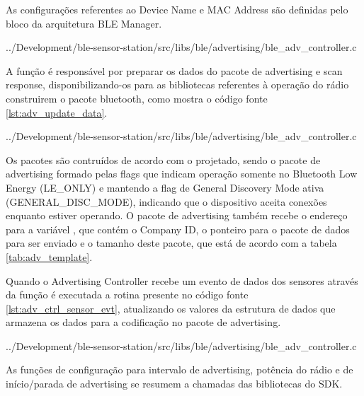 As configurações referentes ao Device Name e MAC Address são definidas pelo
bloco da arquitetura BLE Manager.

\begin{minipage}{0.95\linewidth} 

{../Development/ble-sensor-station/src/libs/ble/advertising/ble_adv_controller.c}
\end{minipage}

A função  é responsável por preparar os dados do
pacote de advertising e scan response, disponibilizando-os para as bibliotecas
referentes à operação do rádio construirem o pacote bluetooth, como mostra o código fonte
\ref{lst:adv_update_data}.

\begin{minipage}{0.95\linewidth} 
 
{../Development/ble-sensor-station/src/libs/ble/advertising/ble_adv_controller.c}
\end{minipage}

Os pacotes são contruídos de acordo com o projetado, sendo o pacote de
advertising formado pelas flags que indicam operação somente no Bluetooth Low
Energy (LE\_ONLY) e mantendo a flag de General Discovery Mode ativa
(GENERAL\_DISC\_MODE), indicando que o dispositivo aceita conexões enquanto
estiver operando. O pacote de advertising também recebe o endereço para a
variável , que contém o Company ID, o ponteiro para o
pacote de dados para ser enviado e o tamanho deste pacote, que está de acordo
com a tabela \ref{tab:adv_template}.

Quando o Advertising Controller recebe um evento de dados dos sensores através
da função  é executada a rotina presente no
código fonte \ref{lst:adv_ctrl_sensor_evt}, atualizando os valores da estrutura
de dados que armazena os dados para a codificação no pacote de advertising.

\begin{minipage}{0.95\linewidth} 

{../Development/ble-sensor-station/src/libs/ble/advertising/ble_adv_controller.c}
\end{minipage}

As funções de configuração para intervalo de advertising, potência do rádio e de
início/parada de advertising se resumem a chamadas das bibliotecas do SDK.

